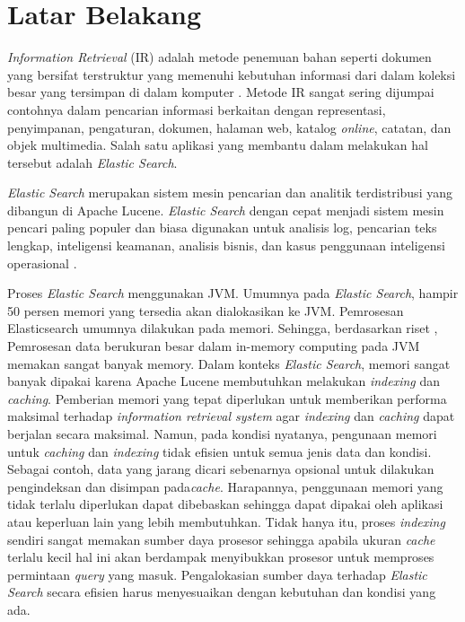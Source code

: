 \section{Latar Belakang}

\textit{Information Retrieval} (IR) adalah metode penemuan bahan seperti dokumen yang bersifat terstruktur yang memenuhi kebutuhan informasi dari dalam koleksi besar yang tersimpan di dalam komputer \parencite{inforetrieval}. Metode IR sangat sering dijumpai contohnya dalam pencarian informasi berkaitan dengan representasi, penyimpanan, pengaturan, dokumen, halaman web, katalog \textit{online}, catatan, dan objek multimedia. Salah satu aplikasi yang membantu dalam melakukan hal tersebut adalah \textit{Elastic Search}.

\textit{Elastic Search} merupakan sistem mesin pencarian dan analitik terdistribusi yang dibangun di Apache Lucene. \textit{Elastic Search} dengan cepat menjadi sistem mesin pencari paling populer dan biasa digunakan untuk analisis log, pencarian teks lengkap, inteligensi keamanan, analisis bisnis, dan kasus penggunaan inteligensi operasional \parencite{elasticsearch}.

Proses \textit{Elastic Search} menggunakan JVM. Umumnya pada \textit{Elastic Search}, hampir 50 persen memori yang tersedia akan dialokasikan ke JVM. Pemrosesan Elasticsearch umumnya dilakukan pada memori. Sehingga, berdasarkan riset \parencite{jvm}, Pemrosesan data berukuran besar dalam in-memory computing pada JVM memakan sangat banyak memory. Dalam konteks \textit{Elastic Search}, memori sangat banyak dipakai karena Apache Lucene membutuhkan melakukan \textit{indexing} dan \textit{caching}. Pemberian memori yang tepat diperlukan untuk memberikan performa maksimal terhadap \textit{information retrieval system} agar \textit{indexing} dan \textit{caching} dapat berjalan secara maksimal. Namun, pada kondisi nyatanya, pengunaan memori untuk \textit{caching} dan \textit{indexing} tidak efisien untuk semua jenis data dan kondisi. Sebagai contoh, data yang jarang dicari sebenarnya opsional untuk dilakukan pengindeksan dan disimpan pada\textit{cache}. Harapannya, penggunaan memori yang tidak terlalu diperlukan dapat dibebaskan sehingga dapat dipakai oleh aplikasi atau keperluan lain yang lebih membutuhkan. Tidak hanya itu, proses \textit{indexing} sendiri sangat memakan sumber daya prosesor sehingga apabila ukuran \textit{cache} terlalu kecil hal ini akan berdampak menyibukkan prosesor untuk memproses permintaan \textit{query} yang masuk. Pengalokasian sumber daya terhadap \textit{Elastic Search} secara efisien harus menyesuaikan dengan kebutuhan dan kondisi yang ada.

